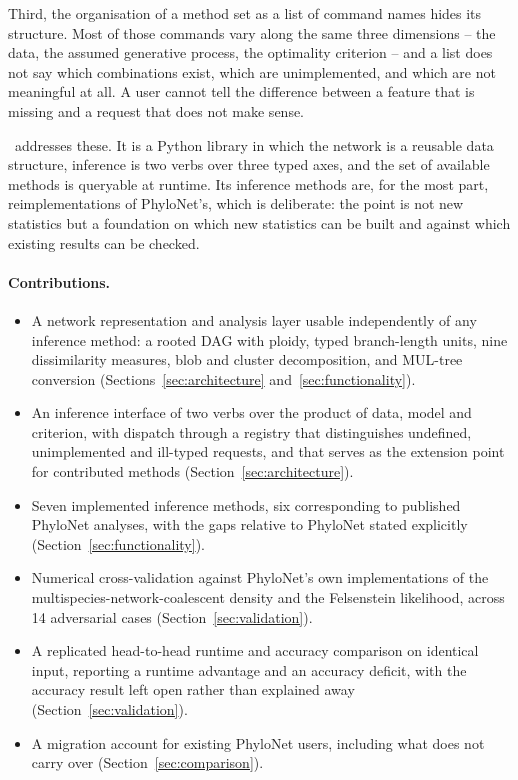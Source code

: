 Third, the organisation of a method set as a list of command names hides its
structure. Most of those commands vary along the same three dimensions -- the
data, the assumed generative process, the optimality criterion -- and a list
does not say which combinations exist, which are unimplemented, and which are
not meaningful at all. A user cannot tell the difference between a feature that
is missing and a request that does not make sense.

\phynetpy\ addresses these. It is a Python library in which the network is a
reusable data structure, inference is two verbs over three typed axes, and the
set of available methods is queryable at runtime. Its inference methods are, for
the most part, reimplementations of PhyloNet's, which is deliberate: the point is
not new statistics but a foundation on which new statistics can be built and
against which existing results can be checked.

\paragraph{Contributions.}
\begin{itemize}
  \item A network representation and analysis layer usable independently of any
    inference method: a rooted DAG with ploidy, typed branch-length units, nine
    dissimilarity measures, blob and cluster decomposition, and MUL-tree
    conversion (Sections~\ref{sec:architecture} and~\ref{sec:functionality}).
  \item An inference interface of two verbs over the product of data, model and
    criterion, with dispatch through a registry that distinguishes undefined,
    unimplemented and ill-typed requests, and that serves as the extension point
    for contributed methods (Section~\ref{sec:architecture}).
  \item Seven implemented inference methods, six corresponding to published
    PhyloNet analyses, with the gaps relative to PhyloNet stated explicitly
    (Section~\ref{sec:functionality}).
  \item Numerical cross-validation against PhyloNet's own implementations of the
    multispecies-network-coalescent density and the Felsenstein likelihood,
    across 14 adversarial cases (Section~\ref{sec:validation}).
  \item A replicated head-to-head runtime and accuracy comparison on identical
    input, reporting a runtime advantage and an accuracy deficit, with the
    accuracy result left open rather than explained away
    (Section~\ref{sec:validation}).
  \item A migration account for existing PhyloNet users, including what does not
    carry over (Section~\ref{sec:comparison}).
\end{itemize}
